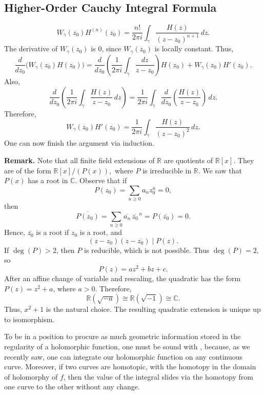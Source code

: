 \documentclass[11pt,a4paper]{article}
\begin{document}
\subsection*{Higher-Order Cauchy Integral Formula}
\[
  W_\gamma(z_0)H^{(n)}(z_0)
  =\frac{n!}{2\pi i}\int_\gamma\frac{H(z)}{(z-z_0)^{n+1}}\,dz.
\]
The derivative of \(W_\gamma(z_0)\) is \(0\), since \(W_\gamma(z_0)\) is locally constant. Thus,
\[
  \frac{d}{dz_0}\bigl(W_\gamma(z_0)H(z_0)\bigr)
  =\frac{d}{dz_0}\left(\frac{1}{2\pi i}\int_\gamma\frac{dz}{z-z_0}\right)H(z_0)
   +W_\gamma(z_0)H'(z_0).
\]
Also,
\[
  \frac{d}{dz_0}\left(\frac{1}{2\pi i}\int_\gamma\frac{H(z)}{z-z_0}\,dz\right)
  =\frac{1}{2\pi i}\int_\gamma
    \frac{d}{dz_0}\left(\frac{H(z)}{z-z_0}\right)\,dz.
\]
Therefore,
\[
  W_\gamma(z_0)H'(z_0)
  =\frac{1}{2\pi i}\int_\gamma\frac{H(z)}{(z-z_0)^2}\,dz.
\]
One can now finish the argument via induction.

\textbf{Remark.}
Note that all finite field extensions of \(\mathbb R\) are quotients of \(\mathbb R[x]\). They are of the form \(\mathbb R[x]/(P(x)),\)
where \(P\) is irreducible in \(\mathbb R\). We saw that \(P(x)\) has a root in \(\mathbb C\). Observe that if
\[
  P(z_0)=\sum_{n\ge0}a_nz_0^n=0,
\]
then
\[
  \overline{P(z_0)}=\sum_{n\ge0}\overline{a_n}\,\overline{z_0}^{\,n}
  =P(\overline{z_0})=0.
\]
Hence, \(\overline{z_0}\) is a root if \(z_0\) is a root, and
\[
  (z-z_0)(z-\overline{z_0})\mid P(z).
\]
If \(\deg(P)>2\), then \(P\) is reducible, which is not possible. Thus \(\deg(P)=2\), so
\[
  P(z)=az^2+bz+c.
\]
After an affine change of variable and rescaling, the quadratic has the form \(P(z)=z^2+a\), where $a>0$.
Therefore,
\[
  \mathbb R(\sqrt{-a})
  \cong\mathbb R(\sqrt{-1})
  \cong\mathbb C.
\]
Thus, \(x^2+1\) is the natural choice. The resulting quadratic extension is unique up to isomorphism.

To be in a position to procure as much geometric information stored in the regularity of a holomorphic function, one must be sound with , because, as we recently saw, one can integrate our holomorphic function on any continuous curve. Moreover, if two curves are homotopic, with the homotopy in the domain of holomorphy of $f$, then the value of the integral slides via the homotopy from one curve to the other without any change.
\end{document}
